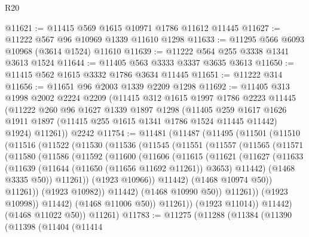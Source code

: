 \begin{lexlean}{R20}
\begin{coremodule}
@11621 := @11415 @569 @1615 @10971 @1786 @11612 @11445
@11627 := @11222 @567 @96 @10969 @1339 @11610 @1298
@11633 := @11295 @566 @6093 @10968 (@3614 @1524) @11610
@11639 := @11222 @564 @255 @3338 @1341 @3613 @1524
@11644 := @11405 @563 @3333 @3337 @3635 @3613
@11650 := @11415 @562 @1615 @3332 @1786 @3634 @11445
@11651 := @11222 @314
@11656 := @11651 @96 @2003 @1339 @2209 @1298
@11692 := @11405
    @313
    @1998
    @2002
    @2224
    @2209
    (@11415
      @312
      @1615
      @1997
      @1786
      @2223
      @11445
      (@11222
        @260
        @96
        @1627
        @1339
        @1897
        @1298
        (@11405
          @259
          @1617
          @1626
          @1911
          @1897
          (@11415 @255 @1615 @1341 @1786 @1524 @11445 @11442)
          @1924)
        @11261))
    @2242
@11754 := @11481
    (@11487
      (@11495
        (@11501
          (@11510
            (@11516
              (@11522
                (@11530
                  (@11536
                    (@11545
                      (@11551
                        (@11557
                          (@11565
                            (@11571
                              (@11580
                                (@11586
                                  (@11592
                                    (@11600
                                      (@11606
                                        (@11615
                                          (@11621
                                            (@11627
                                              (@11633
                                                (@11639
                                                  (@11644 (@11650 (@11656 @11692 @11261)) @3653)
                                                  @11442)
                                                (@1468 @3335 @50))
                                              @11261))
                                          (@1923 @10966))
                                        @11442)
                                      (@1468 @10974 @50))
                                    @11261))
                                (@1923 @10982))
                              @11442)
                            (@1468 @10990 @50))
                          @11261))
                      (@1923 @10998))
                    @11442)
                  (@1468 @11006 @50))
                @11261))
            (@1923 @11014))
          @11442)
        (@1468 @11022 @50))
      @11261)
@11783 := @11275
    (@11288
      (@11384
        (@11390
          (@11398
            (@11404
              (@11414

\end{coremodule}
\end{lexlean}
